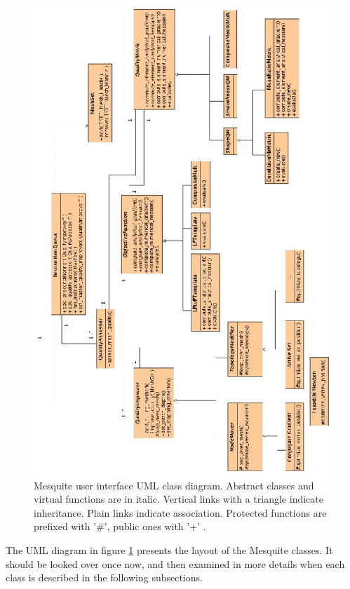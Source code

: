 \begin{figure}[htbp]
\begin{center}
    \includegraphics{MesquiteUI.eps}
    \caption{Mesquite user interface UML class diagram.  Abstract
             classes and virtual functions are in italic. Vertical
             links with a triangle indicate inheritance. Plain links
             indicate association. Protected functions are prefixed
             with '\#', public ones with '+' .}
    \label{fig:uml}
\end{center}
\end{figure}

The UML diagram in figure \ref{fig:uml} presents the layout of the Mesquite classes. It should be
looked over once now, and then examined in more details when each class is described in the
following subsections.


